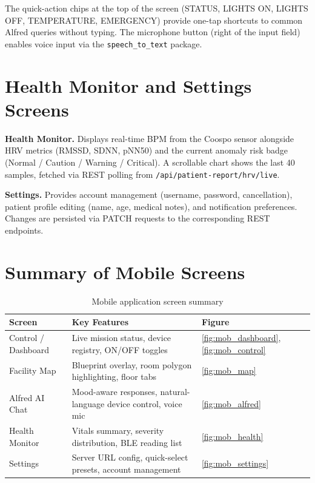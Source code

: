 The quick-action chips at the top of the screen (STATUS, LIGHTS ON,
LIGHTS OFF, TEMPERATURE, EMERGENCY) provide one-tap shortcuts to common
Alfred queries without typing. The microphone button (right of the input
field) enables voice input via the \texttt{speech\_to\_text} package.

\newpage
\section{Health Monitor and Settings Screens}

\textbf{Health Monitor.} Displays real-time BPM from the Coospo sensor
alongside HRV metrics (RMSSD, SDNN, pNN50) and the current anomaly risk
badge (Normal / Caution / Warning / Critical). A scrollable chart shows
the last 40 samples, fetched via REST polling from \texttt{/api/patient-report/hrv/live}.

\textbf{Settings.} Provides account management (username, password,
cancellation), patient profile editing (name, age, medical notes), and
notification preferences. Changes are persisted via PATCH requests to
the corresponding REST endpoints.

\section{Summary of Mobile Screens}

\begin{table}[ht]
\centering
\caption{Mobile application screen summary}
\label{tab:mob_screens}
\begin{tabular}{lll}
\toprule
\textbf{Screen}   & \textbf{Key Features} & \textbf{Figure} \\
\midrule
Control / Dashboard &
  Live mission status, device registry, ON/OFF toggles &
  \ref{fig:mob_dashboard}, \ref{fig:mob_control} \\[4pt]
Facility Map &
  Blueprint overlay, room polygon highlighting, floor tabs &
  \ref{fig:mob_map} \\[4pt]
Alfred AI Chat &
  Mood-aware responses, natural-language device control, voice mic &
  \ref{fig:mob_alfred} \\[4pt]
Health Monitor &
  Vitals summary, severity distribution, BLE reading list &
  \ref{fig:mob_health} \\[4pt]
Settings &
  Server URL config, quick-select presets, account management &
  \ref{fig:mob_settings} \\
\bottomrule
\end{tabular}
\end{table}
